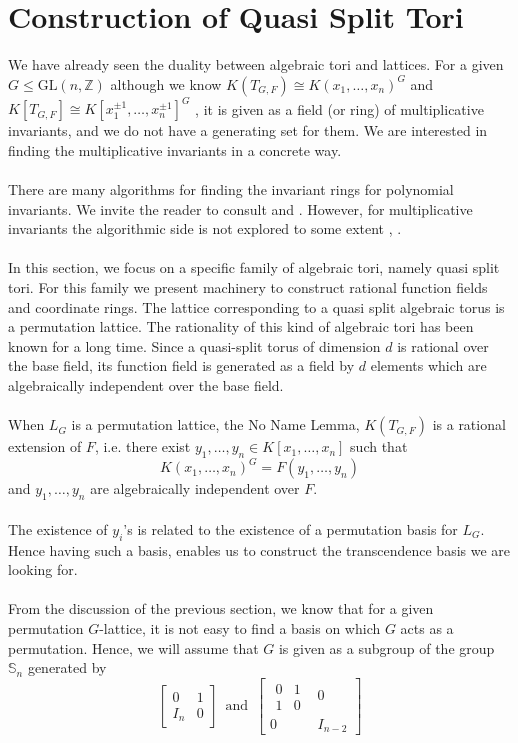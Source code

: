 \documentclass{article}
\theoremstyle{plain}
\theoremstyle{definition}
\newcommand{\Z}{\ensuremath{\mathbb{Z}}}
\begin{document}
\section{Construction of Quasi Split Tori}
We have already seen the duality between algebraic tori and lattices. For a given $G \leq \mathrm{GL}(n,\Z)$ although we know $K(T_{G,F}) \cong K(x_1, \ldots, x_n)^G$ and $K[T_{G,F}] \cong K[x^{\pm 1}_1, \ldots , x^{\pm 1}_n]^G$ , it is given as a field (or ring) of multiplicative invariants, and we do not have a generating set for them. We are interested in finding the multiplicative invariants in a concrete way.\\
\\
There are many algorithms for finding the invariant rings for polynomial invariants. We invite the reader to consult \cite{Kemper2} and \cite{Sturmfels}. However, for multiplicative invariants the algorithmic side is not explored to some extent \cite{Kemper}, \cite{Renault}.\\
\\ 
In this section, we focus on a specific family of algebraic tori, namely quasi split tori. For this family we present machinery to construct rational function fields and coordinate rings. The lattice corresponding to a quasi split algebraic torus is a permutation lattice. The rationality of this kind of algebraic tori has been known for a long time. Since a quasi-split torus of dimension $d$ is rational over the base field, its function field is generated as a field by $d$ elements which are algebraically independent over the base field.\\
\\
When $L_G$ is a permutation lattice, the No Name Lemma, $K(T_{G,F})$ is a rational extension of $F$, i.e. there exist $y_1,\ldots,y_n \in K[x_1, \ldots , x_n]$ such that  $$K(x_1, \ldots, x_n)^G = F(y_1,\ldots,y_n)$$ and $y_1, \ldots, y_n$ are algebraically independent over $F$.\\
\\The existence of $y_i$'s is related to the existence of a permutation basis for $L_G$. Hence having such a basis, enables us to construct the transcendence basis we are looking for.\\
\\
From the discussion of the previous section, we know that for a given permutation $G$-lattice, it is not easy to find a basis on which $G$ acts as a permutation. Hence, we will assume that $G$ is given as a subgroup of the group $\mathbb{S}_n$ generated by 
$$
\left[ \begin{array}{c|c}
0 & 1\\
\hline
I_n &0
\end{array} \right] \,\,\,
\text{and} \,\,\,
\left[ \begin{array}{c|c}
\begin{array}{cc}
0 & 1\\
1 & 0
\end{array} & 0\\
\hline
0 & I_{n-2}
\end{array}
\right]$$
\end{document}
